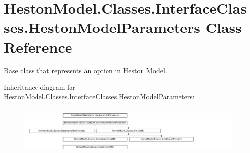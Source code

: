 \hypertarget{class_heston_model_1_1_classes_1_1_interface_classes_1_1_heston_model_parameters}{}\section{Heston\+Model.\+Classes.\+Interface\+Classes.\+Heston\+Model\+Parameters Class Reference}
\label{class_heston_model_1_1_classes_1_1_interface_classes_1_1_heston_model_parameters}


Base class that represents an option in Heston Model.  


Inheritance diagram for Heston\+Model.\+Classes.\+Interface\+Classes.\+Heston\+Model\+Parameters\+:\begin{figure}[H]
\begin{center}
\leavevmode
\includegraphics[height=2.443281cm]{class_heston_model_1_1_classes_1_1_interface_classes_1_1_heston_model_parameters}
\end{center}
\end{figure}
